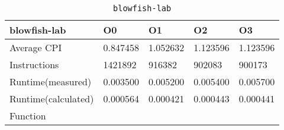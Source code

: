 \begin{table}[ht!]
\centering
\caption{\texttt{blowfish-lab}}
\label{tab:blowfish-lab}
\begin{tabular}{|l|l|l|l|l|}
\hline
\textbf{blowfish-lab}	&	\textbf{O0}	&	\textbf{O1}	&	\textbf{O2}	&	\textbf{O3}	\\\hline\hline
Average CPI	&	0.847458	&	1.052632	&	1.123596	&	1.123596	\\\hline
Instructions	&	1421892	&	916382	&	902083	&	900173	\\\hline
Runtime(measured)	&	0.003500	&	0.005200	&	0.005400	&	0.005700	\\\hline
Runtime(calculated)	&	0.000564	&	0.000421	&	0.000443	&	0.000441	\\\hline
Function	&		&		&		&		\\\hline
\end{tabular}
\end{table}
